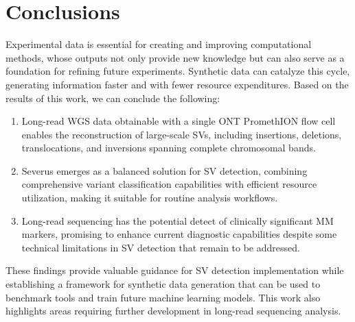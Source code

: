 \chapter{Conclusions}

Experimental data is essential for creating and improving computational methods, 
whose outputs not only provide new knowledge but can also serve as a foundation 
for refining future experiments. Synthetic data can catalyze this cycle, 
generating information faster and with fewer resource expenditures. Based on the 
results of this work, we can conclude the following:

\begin{enumerate}

    \item Long-read WGS data obtainable with a single ONT PromethION flow cell 
    enables the reconstruction of large-scale SVs, including insertions, deletions, 
    translocations, and inversions spanning complete chromosomal bands.
    
    \item Severus emerges as a balanced solution for SV detection, combining 
    comprehensive variant classification capabilities with efficient resource 
    utilization, making it suitable for routine analysis workflows.
    
    \item Long-read sequencing has the potential detect of clinically 
    significant MM markers, promising to enhance current diagnostic capabilities 
    despite some technical limitations in SV detection that remain to be addressed.

\end{enumerate}

These findings provide valuable guidance for SV detection implementation while 
establishing a framework for synthetic data generation that can be used to 
benchmark tools and train future machine learning models. This work also 
highlights areas requiring further development in long-read sequencing analysis.



